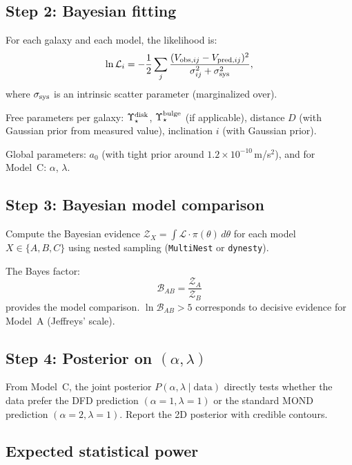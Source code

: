 \documentclass[11pt]{article}
\newcommand{\ee}[1]{\times 10^{#1}}
\begin{document}
\subsection{Step 2: Bayesian fitting}

For each galaxy and each model, the likelihood is:
\begin{equation}
\ln \mathcal{L}_i = -\frac{1}{2}\sum_j
\frac{(V_{{\rm obs},ij} - V_{{\rm pred},ij})^2}{\sigma_{ij}^2
+ \sigma_{\rm sys}^2},
\end{equation}
where $\sigma_{\rm sys}$ is an intrinsic scatter parameter
(marginalized over).

Free parameters per galaxy: $\Upsilon_\star^{\rm disk}$,
$\Upsilon_\star^{\rm bulge}$ (if applicable), distance $D$
(with Gaussian prior from measured value), inclination $i$
(with Gaussian prior).

Global parameters: $a_0$ (with tight prior around
$1.2\ee{-10}$\,m/s$^2$), and for Model~C: $\alpha$, $\lambda$.

\subsection{Step 3: Bayesian model comparison}

Compute the Bayesian evidence $\mathcal{Z}_X = \int \mathcal{L}
\cdot \pi(\theta)\,d\theta$ for each model $X \in \{A, B, C\}$
using nested sampling (\texttt{MultiNest} or \texttt{dynesty}).

The Bayes factor:
\begin{equation}
\mathcal{B}_{AB} = \frac{\mathcal{Z}_A}{\mathcal{Z}_B}
\end{equation}
provides the model comparison. $\ln \mathcal{B}_{AB} > 5$ corresponds
to decisive evidence for Model~A (Jeffreys' scale).

\subsection{Step 4: Posterior on $(\alpha, \lambda)$}

From Model~C, the joint posterior $P(\alpha, \lambda \mid \text{data})$
directly tests whether the data prefer the DFD prediction
$(\alpha = 1, \lambda = 1)$ or the standard MOND prediction
$(\alpha = 2, \lambda = 1)$. Report the 2D posterior with credible
contours.

\subsection{Expected statistical power}
\end{document}
